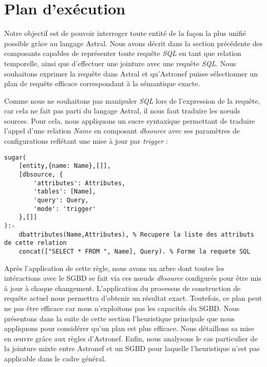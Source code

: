 \section{Plan d'exécution}\label{sec:contrib:asteroid:reecriture}
Notre objectif est de pouvoir interroger toute entité de la façon la plus unifié possible grâce au langage Astral. Nous avons décrit dans la section précédente des composants capables de représenter toute requête \textit{SQL} en tant que relation temporelle, ainsi que d'effectuer une jointure avec une requête \textit{SQL}. Nous souhaitons exprimer la requête dans Astral et qu'Astronef puisse sélectionner un plan de requête efficace correspondant à la sémantique exacte.

Comme nous ne souhaitons pas manipuler \textit{SQL} lors de l'expression de la requête, car cela ne fait pas parti du langage Astral, il nous faut traduire les nœuds sources. Pour cela, nous appliquons un sucre syntaxique permettant de traduire l'appel d'une relation \textit{Name} en composant \textit{dbsource} avec ses paramètres de configurations reflétant une mise à jour par \textit{trigger} :
\begin{lstlisting}
sugar(
    [entity,{name: Name},[]],
    [dbsource, {
        'attributes': Attributes,
        'tables': [Name],
        'query': Query,
        'mode': 'trigger'
    },[]]
):-
    dbattributes(Name,Attributes), % Recupere la liste des attributs de cette relation
    concat(["SELECT * FROM ", Name], Query). % Forme la requete SQL
\end{lstlisting}
Après l'application de cette règle, nous avons un arbre dont toutes les intéractions avec le SGBD se fait via ces nœuds \textit{dbsource} configurés pour être mis à jour à chaque changement. L'application du processus de construction de requête actuel nous permettra d'obtenir un résultat exact. Toutefois, ce plan peut ne pas être efficace car nous n'exploitons pas les capacités du SGBD. Nous présentons dans la suite de cette section l'heuristique principale que nous appliquons pour considérer qu'un plan est plus efficace. Nous détaillons sa mise en œuvre grâce aux règles d'Astronef. Enfin, nous analysons le cas particulier de la jointure mixte entre Astronef et un SGBD pour laquelle l'heuristique n'est pas applicable dans le cadre général.

